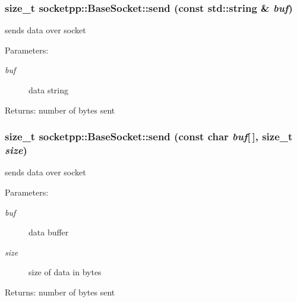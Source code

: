 \begin{CompactItemize}
{\subsubsection[{send}]{\setlength{\rightskip}{0pt plus 5cm}size\_\-t socketpp::BaseSocket::send (const std::string \& {\em buf})}}
\label{classsocketpp_1_1BaseSocket_fb896f016a243ddbb661acc7b05826bf}


sends data over socket 

\begin{Desc}
\item[Parameters:]
\begin{description}
\item[{\em buf}]data string \end{description}
\end{Desc}
\begin{Desc}
\item[Returns:]number of bytes sent \end{Desc}
\hypertarget{classsocketpp_1_1BaseSocket_bf4e15b88271e34e606b9b2a5b384b5b}{
\subsubsection[{send}]{\setlength{\rightskip}{0pt plus 5cm}size\_\-t socketpp::BaseSocket::send (const char {\em buf}\mbox{[}$\,$\mbox{]}, \/  size\_\-t {\em size})}}
\label{classsocketpp_1_1BaseSocket_bf4e15b88271e34e606b9b2a5b384b5b}


sends data over socket 

\begin{Desc}
\item[Parameters:]
\begin{description}
\item[{\em buf}]data buffer \item[{\em size}]size of data in bytes \end{description}
\end{Desc}
\begin{Desc}
\item[Returns:]number of bytes sent \end{Desc}
\hypertarget{classsocketpp_1_1BaseSocket_5fd9737270ee71d2292e70ed625d63f9}{
}
\end{CompactItemize}
